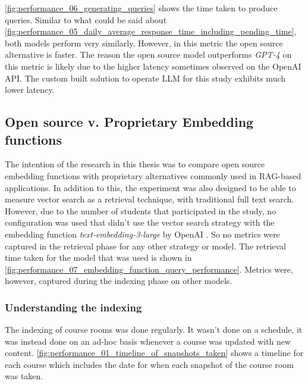 


\autoref{fig:performance_06_generating_queries} shows the time taken to produce queries. Similar to what could be said about \autoref{fig:performance_05_daily_average_response_time_including_pending_time}, both models perform very similarly. However, in this metric the open source alternative is faster. The reason the open source model outperforms \textit{GPT-4} on this metric is likely due to the higher latency sometimes observed on the OpenAI API. The custom built solution to operate \gls{LLM} for this study exhibits much lower latency.





\subsection{Open source v. Proprietary Embedding functions}


The intention of the research in this thesis was to compare open source embedding functions with proprietary alternatives commonly used in \gls{RAG}-based applications. In addition to this, the experiment was also designed to be able to measure vector search as a retrieval technique, with traditional full text search. However, due to the number of students that participated in the study, no configuration was used that didn’t use the vector search strategy with the embedding function \textit{text-embedding-3-large} by OpenAI \cite{openai_new_2024}. So no metrics were captured in the retrieval phase for any other strategy or model. The retrieval time taken for the model that was used is shown in \autoref{fig:performance_07_embedding_function_query_performance}. Metrics were, however, captured during the indexing phase on other models.





\subsubsection{Understanding the indexing}
\label{sec:understanding_indexing}


The indexing of course rooms was done regularly. It wasn’t done on a schedule, it was instead done on an ad-hoc basis whenever a course was updated with new content. \autoref{fig:performance_01_timeline_of_snapshots_taken} shows a timeline for each course which includes the date for when each snapshot of the course room was taken.


